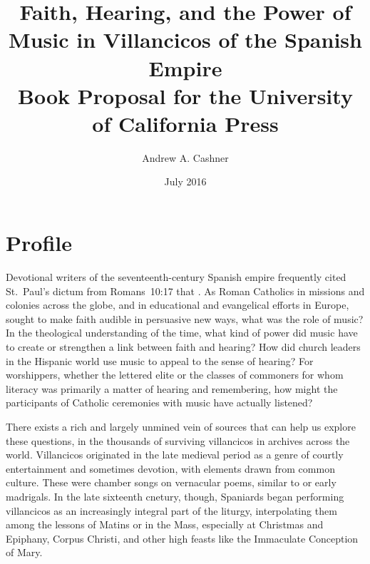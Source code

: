 \documentclass{vcbook-proposal}
\begin{document}
\begin{frontmatter}
\title{Faith, Hearing, and the Power of Music in Villancicos of the Spanish Empire\\[1ex]
Book Proposal for the University of California Press}
\author{Andrew A. Cashner}
\date{July 2016}
\maketitle

\tableofcontents
\end{frontmatter}

\section{Profile}

Devotional writers of the seventeenth-century Spanish empire frequently cited St.~Paul's dictum from Romans~10:17 that .
As Roman Catholics in missions and colonies across the globe, and in educational and evangelical efforts in Europe, sought to make faith audible in persuasive new ways, what was the role of music?
In the theological understanding of the time, what kind of power did music have to create or strengthen a link between faith and hearing?
How did church leaders in the Hispanic world use music to appeal to the sense of hearing?
For worshippers, whether the lettered elite or the classes of commoners for whom literacy was primarily a matter of hearing and remembering, how might the participants of Catholic ceremonies with music have actually listened?

There exists a rich and largely unmined vein of sources that can help us explore these questions, in the thousands of surviving villancicos in archives across the world.
Villancicos originated in the late medieval period as a genre of courtly entertainment and sometimes devotion, with elements drawn from common culture.
These were chamber songs on vernacular poems, similar to  or early madrigals.
In the late sixteenth cnetury, though, Spaniards began performing villancicos as an increasingly integral part of the liturgy, interpolating them among the lessons of Matins or in the Mass, especially at Christmas and Epiphany, Corpus Christi, and other high feasts like the Immaculate Conception of Mary.
\end{document}

